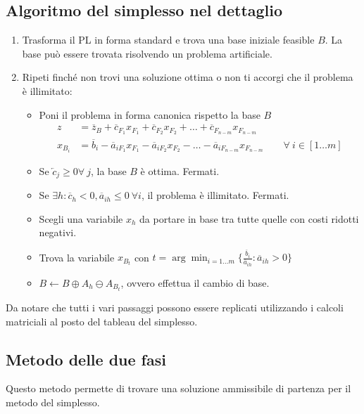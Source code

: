 \subsection{Algoritmo del simplesso nel dettaglio}

\begin{enumerate}
	\item Trasforma il PL in forma standard e trova una base iniziale feasible $B$. La base può essere trovata risolvendo un problema artificiale.
	\item Ripeti finché non trovi una soluzione ottima o non ti accorgi che il problema è illimitato:
	\begin{itemize}
		\item Poni il problema in forma canonica rispetto la base $B$
		\begin{align*}
		z &= \overline{z}_B + \overline{c}_{F_1} x_{F_1} 
		+ \overline{c}_{F_2} x_{F_2} + \ldots + \overline{c}_{F_{n-m}} x_{F_{n-m}} \\
		x_{B_i} &= \overline{b}_i - \overline{a}_{iF_1} x_{F_1} - \overline{a}_{iF_2} x_{F_2} - \ldots - \overline{a}_{iF_{n-m}} x_{F_{n-m}} \qquad \forall \: i \in [1 \ldots m]
		\end{align*}
		\item Se $\overleftarrow{c}_j \geq 0 \forall \ j$, la base $B$ è ottima. Fermati.
		\item Se $\exists h : \overline{c}_h < 0 , \overline{a}_{ih}\leq 0 \ \forall i$, il problema è illimitato. Fermati.
		\item Scegli una variabile $x_h$ da portare in base tra tutte quelle con costi ridotti negativi.
		\item Trova la variabile $x_{B_t}$ con $ t = \arg \min_{i = 1 \ldots m} \bigg\{ \frac{\overline{b}_i}{\overline{a}_{ih}}  : \overline{a}_{ih} > 0 \bigg\}$
		\item $B \leftarrow B \oplus A_h \ominus A_{B_t}$, ovvero effettua il cambio di base.
	\end{itemize}
\end{enumerate}

Da notare che tutti i vari passaggi possono essere replicati utilizzando i calcoli matriciali al posto del tableau del simplesso.


\subsection{Metodo delle due fasi}

Questo metodo permette di trovare una soluzione ammissibile di partenza per il metodo del simplesso.

